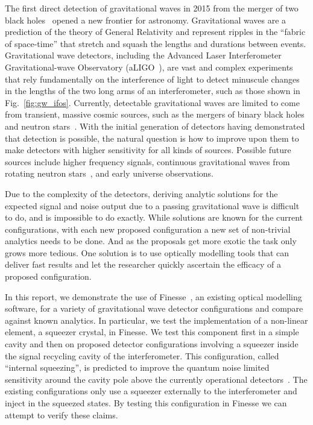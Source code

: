 \documentclass[aps,pra,superscriptaddress,reprint,nofootinbib]{revtex4-1}
\begin{document}
The first direct detection of gravitational waves in 2015 from the merger of two black holes~\cite{GW150914} opened a new frontier for astronomy. 
Gravitational waves are a prediction of the theory of General Relativity and represent ripples in the ``fabric of space-time'' that stretch and squash the lengths and durations between events. Gravitational wave detectors, including the Advanced Laser Interferometer Gravitational-wave Observatory (aLIGO~\cite{AdvancedLIGO:2015}), are vast and complex experiments that rely fundamentally on the interference of light to detect minuscule changes in the lengths of the two long arms of an interferometer, such as those shown in Fig.~\ref{fig:gw_ifos}. Currently, detectable gravitational waves are limited to come from transient, massive cosmic sources, such as the mergers of binary black holes and neutron stars~\cite{GWTC-1:2018}. With the initial generation of detectors having demonstrated that detection is possible, the natural question is how to improve upon them to make detectors with higher sensitivity for all kinds of sources. Possible future sources include higher frequency signals, continuous gravitational waves from rotating neutron stars~\cite{SuvorovaEtAl:2016}, and early universe observations.


Due to the complexity of the detectors, deriving analytic solutions for the expected signal and noise output due to a passing gravitational wave is difficult to do, and is impossible to do exactly. %
While solutions are known for the current configurations, with each new proposed configuration a new set of non-trivial analytics needs to be done. And as the proposals get more exotic the task only grows more tedious.
One solution is to use optically modelling tools that can deliver fast results and let the researcher quickly ascertain the efficacy of a proposed configuration. 


In this report, we demonstrate the use of Finesse~\cite{finesse}, an existing optical modelling software, for a variety of gravitational wave detector configurations and compare against known analytics. In particular, we test the implementation of a non-linear element, a squeezer crystal, in Finesse. We test this component first in a simple cavity and then on proposed detector configurations involving a squeezer inside the signal recycling cavity of the interferometer. This configuration, called ``internal squeezing'', is predicted to improve the quantum noise limited sensitivity around the cavity pole above the currently operational detectors~\cite{Korobko_2019,Adya_2020}. The existing configurations only use a squeezer externally to the interferometer and inject in the squeezed states. By testing this configuration in Finesse we can attempt to verify these claims. 
\end{document}
